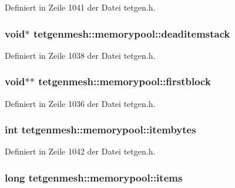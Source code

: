 Definiert in Zeile 1041 der Datei tetgen.\-h.

\hypertarget{classtetgenmesh_1_1memorypool_a5979100eaabf64ef2179a259e3adf0b7}{
\subsubsection[{deaditemstack}]{\setlength{\rightskip}{0pt plus 5cm}void$\ast$ tetgenmesh\-::memorypool\-::deaditemstack}}\label{classtetgenmesh_1_1memorypool_a5979100eaabf64ef2179a259e3adf0b7}


Definiert in Zeile 1038 der Datei tetgen.\-h.

\hypertarget{classtetgenmesh_1_1memorypool_a5a00ffcfb581ef96fb53c995b25838ee}{
\subsubsection[{firstblock}]{\setlength{\rightskip}{0pt plus 5cm}void$\ast$$\ast$ tetgenmesh\-::memorypool\-::firstblock}}\label{classtetgenmesh_1_1memorypool_a5a00ffcfb581ef96fb53c995b25838ee}


Definiert in Zeile 1036 der Datei tetgen.\-h.

\hypertarget{classtetgenmesh_1_1memorypool_adadcd6a22bbdd129b29e1a7a3cc4de43}{
\subsubsection[{itembytes}]{\setlength{\rightskip}{0pt plus 5cm}int tetgenmesh\-::memorypool\-::itembytes}}\label{classtetgenmesh_1_1memorypool_adadcd6a22bbdd129b29e1a7a3cc4de43}


Definiert in Zeile 1042 der Datei tetgen.\-h.

\hypertarget{classtetgenmesh_1_1memorypool_af29a38b2654a8d977dd24eea8dc72729}{
\subsubsection[{items}]{\setlength{\rightskip}{0pt plus 5cm}long tetgenmesh\-::memorypool\-::items}}\label{classtetgenmesh_1_1memorypool_af29a38b2654a8d977dd24eea8dc72729}



